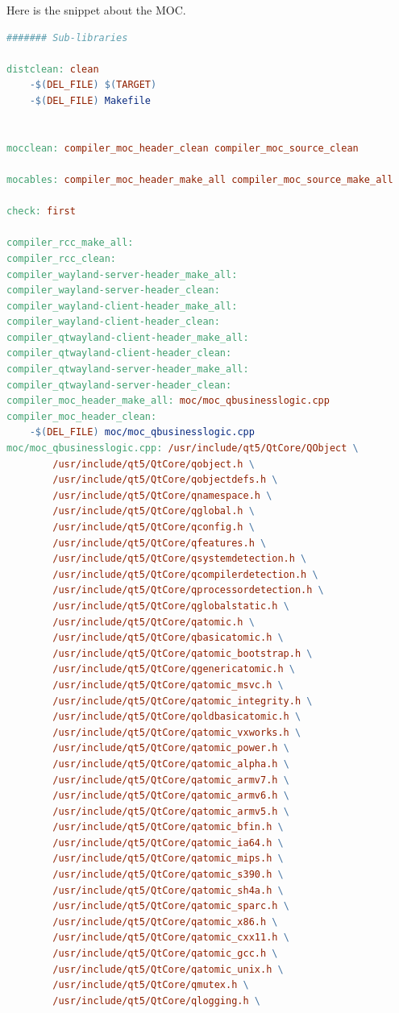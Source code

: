 %
Here is the snippet about the MOC.
%
\begin{lstlisting}[language=make]
####### Sub-libraries

distclean: clean
	-$(DEL_FILE) $(TARGET) 
	-$(DEL_FILE) Makefile


mocclean: compiler_moc_header_clean compiler_moc_source_clean

mocables: compiler_moc_header_make_all compiler_moc_source_make_all

check: first

compiler_rcc_make_all:
compiler_rcc_clean:
compiler_wayland-server-header_make_all:
compiler_wayland-server-header_clean:
compiler_wayland-client-header_make_all:
compiler_wayland-client-header_clean:
compiler_qtwayland-client-header_make_all:
compiler_qtwayland-client-header_clean:
compiler_qtwayland-server-header_make_all:
compiler_qtwayland-server-header_clean:
compiler_moc_header_make_all: moc/moc_qbusinesslogic.cpp
compiler_moc_header_clean:
	-$(DEL_FILE) moc/moc_qbusinesslogic.cpp
moc/moc_qbusinesslogic.cpp: /usr/include/qt5/QtCore/QObject \
		/usr/include/qt5/QtCore/qobject.h \
		/usr/include/qt5/QtCore/qobjectdefs.h \
		/usr/include/qt5/QtCore/qnamespace.h \
		/usr/include/qt5/QtCore/qglobal.h \
		/usr/include/qt5/QtCore/qconfig.h \
		/usr/include/qt5/QtCore/qfeatures.h \
		/usr/include/qt5/QtCore/qsystemdetection.h \
		/usr/include/qt5/QtCore/qcompilerdetection.h \
		/usr/include/qt5/QtCore/qprocessordetection.h \
		/usr/include/qt5/QtCore/qglobalstatic.h \
		/usr/include/qt5/QtCore/qatomic.h \
		/usr/include/qt5/QtCore/qbasicatomic.h \
		/usr/include/qt5/QtCore/qatomic_bootstrap.h \
		/usr/include/qt5/QtCore/qgenericatomic.h \
		/usr/include/qt5/QtCore/qatomic_msvc.h \
		/usr/include/qt5/QtCore/qatomic_integrity.h \
		/usr/include/qt5/QtCore/qoldbasicatomic.h \
		/usr/include/qt5/QtCore/qatomic_vxworks.h \
		/usr/include/qt5/QtCore/qatomic_power.h \
		/usr/include/qt5/QtCore/qatomic_alpha.h \
		/usr/include/qt5/QtCore/qatomic_armv7.h \
		/usr/include/qt5/QtCore/qatomic_armv6.h \
		/usr/include/qt5/QtCore/qatomic_armv5.h \
		/usr/include/qt5/QtCore/qatomic_bfin.h \
		/usr/include/qt5/QtCore/qatomic_ia64.h \
		/usr/include/qt5/QtCore/qatomic_mips.h \
		/usr/include/qt5/QtCore/qatomic_s390.h \
		/usr/include/qt5/QtCore/qatomic_sh4a.h \
		/usr/include/qt5/QtCore/qatomic_sparc.h \
		/usr/include/qt5/QtCore/qatomic_x86.h \
		/usr/include/qt5/QtCore/qatomic_cxx11.h \
		/usr/include/qt5/QtCore/qatomic_gcc.h \
		/usr/include/qt5/QtCore/qatomic_unix.h \
		/usr/include/qt5/QtCore/qmutex.h \
		/usr/include/qt5/QtCore/qlogging.h \

\end{lstlisting}
